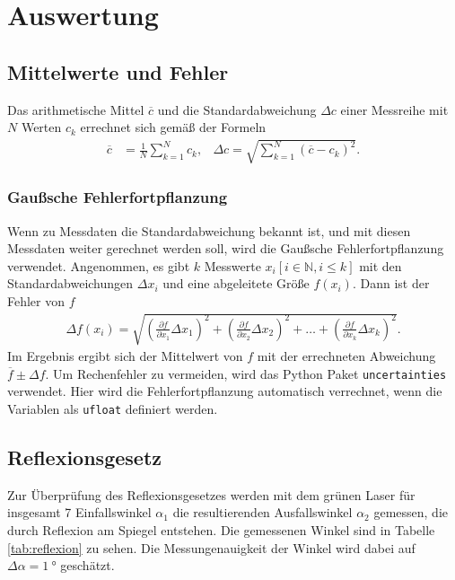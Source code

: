 \section{Auswertung}

\subsection{Mittelwerte und Fehler}
Das arithmetische Mittel $\overline{c}$ und die Standardabweichung $\Delta c$ einer Messreihe mit $N$ Werten $c_k$ errechnet sich gemäß der Formeln
\begin{align}
    \overline{c} &= \frac{1}{N} \sum_{k=1}^{N} c_k, & \Delta c = \sqrt{ \sum_{k=1}^{N} \left(\overline{c} - c_k \right)^2 }.
    \label{eq:mittelstand}
\end{align}

\subsubsection{Gaußsche Fehlerfortpflanzung}
Wenn zu Messdaten die Standardabweichung bekannt ist, und mit diesen Messdaten weiter gerechnet werden soll,
wird die Gaußsche Fehlerfortpflanzung verwendet. 
Angenommen, es gibt $k$ Messwerte $x_i [i \in \mathbb{N}, i \leq k]$ mit den Standardabweichungen $\Delta x_i$
und eine abgeleitete Größe $f(x_i)$.
Dann ist der Fehler von $f$
\begin{align}
    \Delta f(x_i) = \sqrt{
    \left(\frac{\partial f}{\partial x_1} \Delta x_1\right)^2%
     + \left(\frac{\partial f}{\partial x_2} \Delta x_2\right)^2%
     + \dots%
     + \left(\frac{\partial f}{\partial x_k} \Delta x_k\right)^2%
    }.
    \label{eq:gauss}
\end{align} 
Im Ergebnis ergibt sich der Mittelwert von $f$ mit der errechneten Abweichung $\overline{f} \pm \Delta f $.
Um Rechenfehler zu vermeiden, wird das Python \cite[]{python} Paket \texttt{uncertainties} \cite[][]{uncertainties} verwendet.
Hier wird die Fehlerfortpflanzung automatisch verrechnet, wenn die Variablen als \texttt{ufloat} definiert werden.







\subsection{Reflexionsgesetz}
Zur Überprüfung des Reflexionsgesetzes werden mit dem grünen Laser für insgesamt 7 Einfallswinkel $\alpha_1$
die resultierenden Ausfallswinkel $\alpha_2$ gemessen, die durch Reflexion am Spiegel entstehen.
Die gemessenen Winkel sind in Tabelle \ref{tab:reflexion} zu sehen.
Die Messungenauigkeit der Winkel wird dabei auf $\Delta \alpha = \qty[]{1}{\degree}$ geschätzt.

